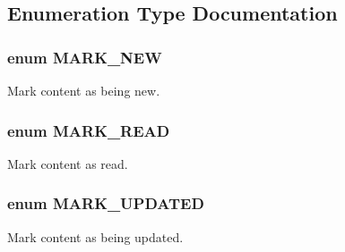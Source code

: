 \subsection{Enumeration Type Documentation}
\hypertarget{group__content__flags_ga44d42cbfa50b553ad2439e19478d0d3d}{
\subsubsection[{MARK\_\-NEW}]{\setlength{\rightskip}{0pt plus 5cm}enum {\bf MARK\_\-NEW}}}
\label{group__content__flags_ga44d42cbfa50b553ad2439e19478d0d3d}
Mark content as being new. \hypertarget{group__content__flags_ga72684c074c0ade1909bad72841c48614}{
\subsubsection[{MARK\_\-READ}]{\setlength{\rightskip}{0pt plus 5cm}enum {\bf MARK\_\-READ}}}
\label{group__content__flags_ga72684c074c0ade1909bad72841c48614}
Mark content as read. \hypertarget{group__content__flags_ga6e9f0d9282433b9f08f025aaca43e1fe}{
\subsubsection[{MARK\_\-UPDATED}]{\setlength{\rightskip}{0pt plus 5cm}enum {\bf MARK\_\-UPDATED}}}
\label{group__content__flags_ga6e9f0d9282433b9f08f025aaca43e1fe}
Mark content as being updated. 